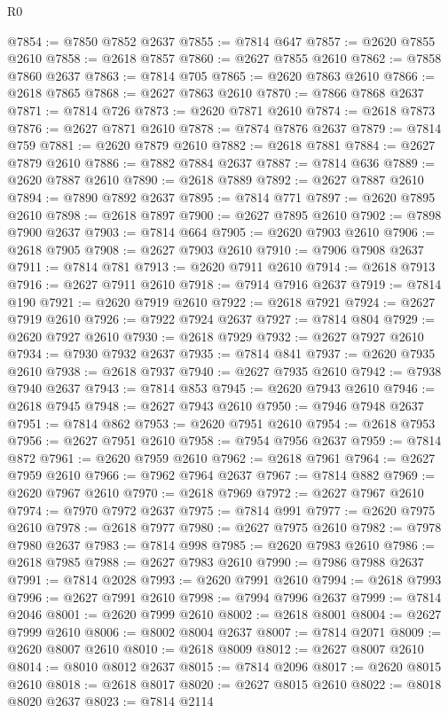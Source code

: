 \begin{lexlean}{R0}
\begin{coremodule}
@7854 := @7850 @7852 @2637
@7855 := @7814 @647
@7857 := @2620 @7855 @2610
@7858 := @2618 @7857
@7860 := @2627 @7855 @2610
@7862 := @7858 @7860 @2637
@7863 := @7814 @705
@7865 := @2620 @7863 @2610
@7866 := @2618 @7865
@7868 := @2627 @7863 @2610
@7870 := @7866 @7868 @2637
@7871 := @7814 @726
@7873 := @2620 @7871 @2610
@7874 := @2618 @7873
@7876 := @2627 @7871 @2610
@7878 := @7874 @7876 @2637
@7879 := @7814 @759
@7881 := @2620 @7879 @2610
@7882 := @2618 @7881
@7884 := @2627 @7879 @2610
@7886 := @7882 @7884 @2637
@7887 := @7814 @636
@7889 := @2620 @7887 @2610
@7890 := @2618 @7889
@7892 := @2627 @7887 @2610
@7894 := @7890 @7892 @2637
@7895 := @7814 @771
@7897 := @2620 @7895 @2610
@7898 := @2618 @7897
@7900 := @2627 @7895 @2610
@7902 := @7898 @7900 @2637
@7903 := @7814 @664
@7905 := @2620 @7903 @2610
@7906 := @2618 @7905
@7908 := @2627 @7903 @2610
@7910 := @7906 @7908 @2637
@7911 := @7814 @781
@7913 := @2620 @7911 @2610
@7914 := @2618 @7913
@7916 := @2627 @7911 @2610
@7918 := @7914 @7916 @2637
@7919 := @7814 @190
@7921 := @2620 @7919 @2610
@7922 := @2618 @7921
@7924 := @2627 @7919 @2610
@7926 := @7922 @7924 @2637
@7927 := @7814 @804
@7929 := @2620 @7927 @2610
@7930 := @2618 @7929
@7932 := @2627 @7927 @2610
@7934 := @7930 @7932 @2637
@7935 := @7814 @841
@7937 := @2620 @7935 @2610
@7938 := @2618 @7937
@7940 := @2627 @7935 @2610
@7942 := @7938 @7940 @2637
@7943 := @7814 @853
@7945 := @2620 @7943 @2610
@7946 := @2618 @7945
@7948 := @2627 @7943 @2610
@7950 := @7946 @7948 @2637
@7951 := @7814 @862
@7953 := @2620 @7951 @2610
@7954 := @2618 @7953
@7956 := @2627 @7951 @2610
@7958 := @7954 @7956 @2637
@7959 := @7814 @872
@7961 := @2620 @7959 @2610
@7962 := @2618 @7961
@7964 := @2627 @7959 @2610
@7966 := @7962 @7964 @2637
@7967 := @7814 @882
@7969 := @2620 @7967 @2610
@7970 := @2618 @7969
@7972 := @2627 @7967 @2610
@7974 := @7970 @7972 @2637
@7975 := @7814 @991
@7977 := @2620 @7975 @2610
@7978 := @2618 @7977
@7980 := @2627 @7975 @2610
@7982 := @7978 @7980 @2637
@7983 := @7814 @998
@7985 := @2620 @7983 @2610
@7986 := @2618 @7985
@7988 := @2627 @7983 @2610
@7990 := @7986 @7988 @2637
@7991 := @7814 @2028
@7993 := @2620 @7991 @2610
@7994 := @2618 @7993
@7996 := @2627 @7991 @2610
@7998 := @7994 @7996 @2637
@7999 := @7814 @2046
@8001 := @2620 @7999 @2610
@8002 := @2618 @8001
@8004 := @2627 @7999 @2610
@8006 := @8002 @8004 @2637
@8007 := @7814 @2071
@8009 := @2620 @8007 @2610
@8010 := @2618 @8009
@8012 := @2627 @8007 @2610
@8014 := @8010 @8012 @2637
@8015 := @7814 @2096
@8017 := @2620 @8015 @2610
@8018 := @2618 @8017
@8020 := @2627 @8015 @2610
@8022 := @8018 @8020 @2637
@8023 := @7814 @2114

\end{coremodule}
\end{lexlean}
